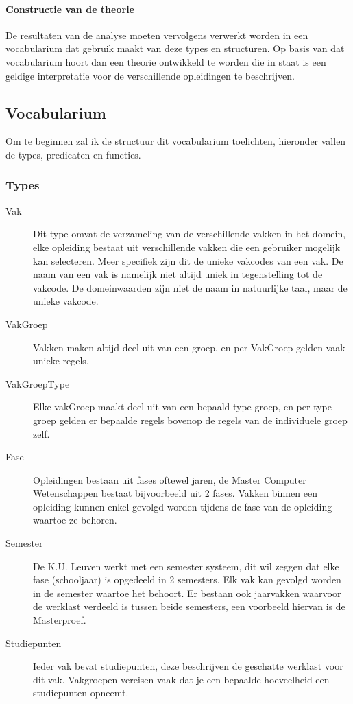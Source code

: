 \paragraph{Constructie van de theorie}
De resultaten van de analyse moeten vervolgens verwerkt worden in een vocabularium dat gebruik maakt van deze types en structuren. Op basis van dat vocabularium hoort dan een theorie ontwikkeld te worden die in staat is een geldige interpretatie voor de verschillende opleidingen te beschrijven. 

\subsection{Vocabularium}
Om te beginnen zal ik de structuur dit vocabularium toelichten, hieronder vallen de types, predicaten en functies.
\subsubsection{Types}
\begin{description}
\item [Vak] Dit type omvat de verzameling van de verschillende vakken in het domein, elke opleiding bestaat uit verschillende vakken die een gebruiker mogelijk kan selecteren. Meer specifiek zijn dit de unieke vakcodes van een vak. De naam van een vak is namelijk niet altijd uniek in tegenstelling tot de vakcode. 
De domeinwaarden zijn niet de naam in natuurlijke taal, maar de unieke vakcode.
\item [VakGroep] Vakken maken altijd deel uit van een groep, en per VakGroep gelden vaak unieke regels. 
\item [VakGroepType] Elke vakGroep maakt deel uit van een bepaald type groep, en per type groep gelden er bepaalde regels bovenop de regels van de individuele groep zelf.
\item [Fase] Opleidingen bestaan uit fases oftewel jaren, de Master Computer Wetenschappen bestaat bijvoorbeeld uit 2 fases. Vakken binnen een opleiding kunnen enkel gevolgd worden tijdens de fase van de opleiding waartoe ze behoren. 
\item [Semester] De K.U. Leuven werkt met een semester systeem, dit wil zeggen dat elke fase (schooljaar) is opgedeeld in 2 semesters. Elk vak kan gevolgd worden in de semester waartoe het behoort. Er bestaan ook jaarvakken waarvoor de werklast verdeeld is tussen beide semesters, een voorbeeld hiervan is de Masterproef.
\item [Studiepunten] Ieder vak bevat studiepunten, deze beschrijven de geschatte werklast voor dit vak. Vakgroepen vereisen vaak dat je een bepaalde hoeveelheid een studiepunten opneemt. 
\end{description}

